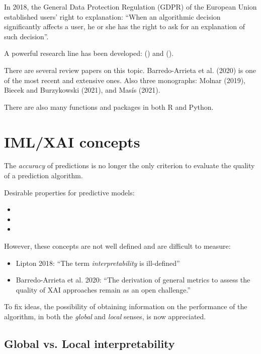 In 2018, the General Data Protection Regulation (GDPR) of the European Union
established users' right to explanation: ``When an algorithmic decision
significantly affects a user, he or she has the right to ask for an explanation
of such decision''.

A powerful research line has been developed:
 () and
 ().

There are several review papers on this topic.
Barredo-Arrieta et al. (2020) is one of the most
recent and extensive ones. %
Also three monographs: Molnar (2019), Biecek and Burzykowski (2021), and
Masís (2021).

There are also many functions and packages in both R and Python.

\section{IML/XAI concepts}

\begin{note}
	The \emph{accuracy} of predictions is no longer the only criterion to evaluate
	the quality of a prediction algorithm.
\end{note}

Desirable properties for predictive models:
\begin{itemize}
	\item {}
	\item {}
	\item {}
\end{itemize}

However, these concepts are not well defined and are difficult to measure:
\begin{itemize}
	\item Lipton 2018: ``The term \emph{interpretability} is ill-defined''
	\item Barredo-Arrieta et al. 2020: ``The derivation of general metrics
	      to assess the quality of XAI approaches remain as an open challenge.''
\end{itemize}

To fix ideas, the possibility of obtaining information on the
performance of the algorithm, in both the \emph{global} and \emph{local} senses, is
now appreciated.

\subsection{Global vs. Local interpretability}


